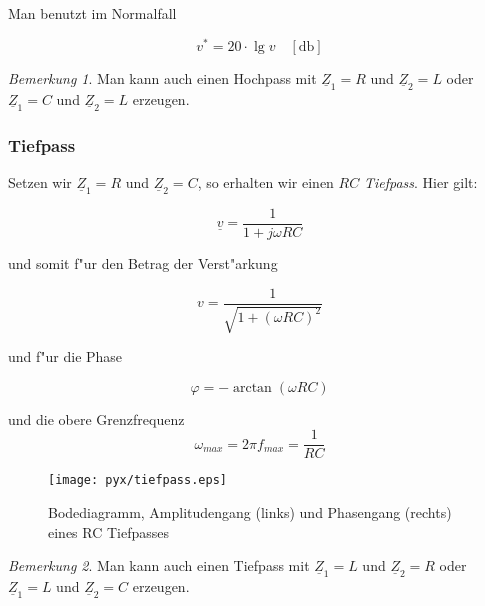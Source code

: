 \documentclass[german, 10pt, a4paper, headsepline]{scrreprt}
\theoremstyle{remark}
\newtheorem*{remark}{Bemerkung}
\begin{document}
Man benutzt im Normalfall

\begin{displaymath}
	v^{\ast} = 20 \cdotp \lg v \quad[\mbox{db}]
\end{displaymath}

\begin{remark}
Man kann auch einen Hochpass mit $\underline{Z}_1=R$ und $\underline{Z}_2=L$ oder $\underline{Z}_1=C$ und $\underline{Z}_2=L$ erzeugen.
\end{remark}

\subsubsection{Tiefpass}

Setzen wir $\underline{Z}_1=R$ und $\underline{Z}_2=C$, so erhalten wir einen $RC$ \textit{Tiefpass}. Hier gilt:

\begin{displaymath}
	\underline{v} = \frac{1}{1+j\omega RC}
\end{displaymath}

und somit f"ur den Betrag der Verst"arkung

\begin{displaymath}
	v = \frac{1}{\sqrt{1+(\omega RC)^2}}
\end{displaymath}

und f"ur die Phase

\begin{displaymath}
	\varphi = -\arctan (\omega RC)
\end{displaymath}

und die obere Grenzfrequenz
\begin{displaymath}
	\omega_{max} = 2\pi f_{max} =\frac{1}{RC}
\end{displaymath}

\begin{figure}[hbt]
 \begin{center}
 	\texttt{[image: pyx/tiefpass.eps]}
 \end{center}
 \caption{Bodediagramm, Amplitudengang (links) und Phasengang (rechts) eines RC Tiefpasses}
 \label{tiefpass}
\end{figure}

\begin{remark}
Man kann auch einen Tiefpass mit $\underline{Z}_1=L$ und $\underline{Z}_2=R$  oder $\underline{Z}_1=L$ und $\underline{Z}_2=C$ erzeugen.
\end{remark}
\end{document}

